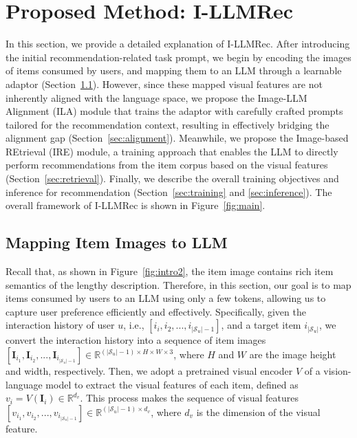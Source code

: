 \documentclass[sigconf]{acmart}
\newcommand{\proposed}{\textsf{I-LLMRec}}
\begin{document}
\section{Proposed Method: \proposed{}}
In this section, we provide a detailed explanation of \proposed{}.
After introducing the initial recommendation-related task prompt, we begin by encoding the images of items consumed by users, and mapping them to an LLM through a learnable adaptor (Section~\ref{sec:map}).
However, since these mapped visual features are not inherently aligned with the language space, we propose the Image-LLM Alignment (ILA) module that trains the adaptor with carefully crafted prompts tailored for the recommendation context, resulting in effectively bridging the alignment gap (Section~\ref{sec:alignment}). Meanwhile, we propose the Image-based REtrieval (IRE) module, a training approach that enables the LLM to directly perform recommendations from the item corpus based on the visual features (Section~\ref{sec:retrieval}). Finally, we describe the overall training objectives and inference for recommendation (Section~\ref{sec:training} and \ref{sec:inference}). The overall framework of \proposed{} is shown in Figure~\ref{fig:main}.

\subsection{Mapping Item Images to LLM}
\label{sec:map}
Recall that, as shown in Figure~\ref{fig:intro2}, the item image contains rich item semantics of the lengthy description. Therefore, in this section, our goal is to map items consumed by users to an LLM using only a few tokens, allowing us to capture user preference efficiently and effectively. 
Specifically, 
given the interaction history of user $u$, i.e., $[i_i, i_2, ..., i_{|\mathcal{S}_u|-1}]$, and a target item $i_{|\mathcal{S}_u|}$, we convert the interaction history into a sequence of item images $[\mathbf{I}_{i_1}, \mathbf{I}_{i_2}, ... , \mathbf{I}_{i_{|\mathcal{S}_u|-1}}] \in \mathbb{R}^{(|\mathcal{S}_u|-1) \times H \times W \times 3}$, where $H$ and $W$ are the image height and width, respectively. Then, we adopt a pretrained visual encoder $V$ of a vision-language model to extract the visual features of each item, defined as $v_i = V(\mathbf{I}_i) \in \mathbb{R}^{d_v}$. This process makes the sequence of visual features $[v_{i_1}, v_{i_2}, ..., v_{i_{|\mathcal{S}_u|-1}}] \in \mathbb{R}^{(|\mathcal{S}_u|-1)\times d_v}$, where $d_v$ is the dimension of the visual feature. 
\end{document}
